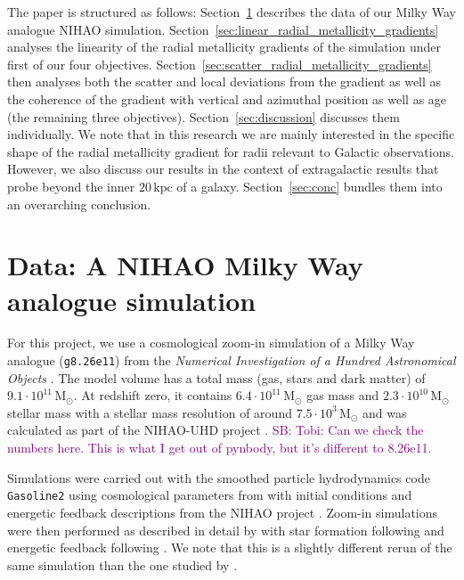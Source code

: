 \documentclass[fleqn,usenatbib]{mnras}
\newcommand{\SB}[1]{{\textcolor{purple}{SB: #1}}}
\begin{document}
The paper is structured as follows: Section~\ref{sec:data} describes the data of our Milky Way analogue NIHAO simulation. Section~\ref{sec:linear_radial_metallicity_gradients} analyses the linearity of the radial metallicity gradients of the simulation under first of our four objectives. Section~\ref{sec:scatter_radial_metallicity_gradients} then analyses both the scatter and local deviations from the gradient as well as the coherence of the gradient with vertical and azimuthal position as well as age (the remaining three objectives). Section~\ref{sec:discussion} discusses them individually. We note that in this research we are mainly interested in the specific shape of the radial metallicity gradient for radii relevant to Galactic observations. However, we also discuss our results in the context of extragalactic results that probe beyond the inner $20\,\mathrm{kpc}$ of a galaxy. Section~\ref{sec:conc} bundles them into an overarching conclusion. 

\section{Data: A NIHAO Milky Way analogue simulation} \label{sec:data}

For this project, we use a cosmological zoom-in simulation of a Milky Way analogue (\texttt{g8.26e11}) from the \textit{Numerical Investigation of a Hundred Astronomical Objects} \citep[NIHAO,][]{Wang2015}. The model volume has a total mass (gas, stars and dark matter) of $9.1 \cdot 10^{11}\,\mathrm{M_\odot}$. At redshift zero, it contains $6.4 \cdot 10^{11}\,\mathrm{M_\odot}$ gas mass and $2.3 \cdot 10^{10}\,\mathrm{M_\odot}$ stellar mass with a stellar mass resolution of around $7.5 \cdot 10^{3}\,\mathrm{M_\odot}$ and was calculated as part of the NIHAO-UHD project \citep{Buck2020b}. \SB{Tobi: Can we check the numbers here. This is what I get out of pynbody, but it's different to 8.26e11.}

Simulations were carried out with the smoothed particle hydrodynamics code \texttt{Gasoline2} \citep{Wadsley2017} using cosmological parameters from \citet{Planck2014} with initial conditions and energetic feedback descriptions from the NIHAO project \citep{Wang2015}. Zoom-in simulations were then performed as described in detail by \citet{Buck2021} with star formation following \citet{Stinson2006} and energetic feedback following \citet{Stinson2013}. We note that this is a slightly different rerun of the same simulation than the one studied by \citet{Buder2024}.
\end{document}
